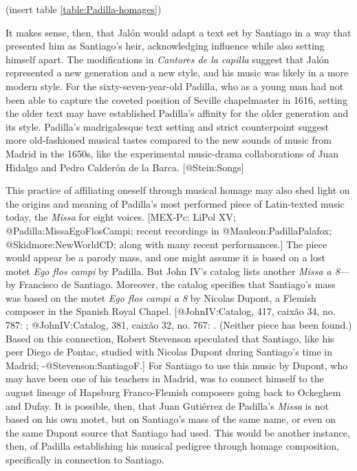 (insert table \ref{table:Padilla-homages})
\label{table:Padilla-homages}

It makes sense, then, that Jalón would adapt a text set by Santiago in a way
that presented him as Santiago's heir, acknowledging influence while also
setting himself apart.
The modifications in \emph{Cantores de la capilla} suggest that Jalón represented a
new generation and a new style, and his music was likely in a more modern style.
For the sixty-seven-year-old Padilla, who as a young man had not been able to
capture the coveted position of Seville chapelmaster in 1616, setting the older
text may have established Padilla's affinity for the older generation and its
style.
Padilla's madrigalesque text setting and strict counterpoint suggest more
old-fashioned musical tastes compared to the new sounds of music from Madrid in
the 1650s, like the experimental music-drama collaborations of Juan Hidalgo
and Pedro Calderón de la Barca.
[@Stein:Songs]

This practice of affiliating oneself through musical homage may also shed light
on the origins and meaning of Padilla's most performed piece of Latin-texted
music today, the \emph{Missa } for eight voices.
[MEX-Pc: LiPol XV; @Padilla:MissaEgoFlosCampi; recent recordings in
@Mauleon:PadillaPalafox; @Skidmore:NewWorldCD; along with many recent
performances.]
The piece would appear be a parody mass, and one might assume it is based on a
lost motet \emph{Ego flos campi} by Padilla.
But John IV's catalog lists another \emph{Missa  a 8}---by Francisco de
Santiago.
Moreover, the catalog specifies that Santiago's mass was based on the motet
\emph{Ego flos campi a 8} by Nicolas Dupont, a Flemish composer in the Spanish Royal
Chapel.
[@JohnIV:Catalog, 417, caixão 34, no. 787: 
; @JohnIV:Catalog, 381, caixão 32, no. 767: .
(Neither piece has been found.)
Based on this connection, Robert Stevenson speculated that Santiago, like his
peer Diego de Pontac, studied with Nicolas Dupont during Santiago's time in
Madrid; -@Stevenson:SantiagoF.]
For Santiago to use this music by Dupont, who may have been one of his teachers
in Madrid, was to connect himself to the august lineage of Hapsburg
Franco-Flemish composers going back to Ockeghem and Dufay.
It is possible, then, that Juan Gutiérrez de Padilla's \emph{Missa }
is not based on his own motet, but on Santiago's mass of the same name, or even
on the same Dupont source that Santiago had used.
This would be another instance, then, of Padilla establishing his musical
pedigree through homage composition, specifically in connection to Santiago.


